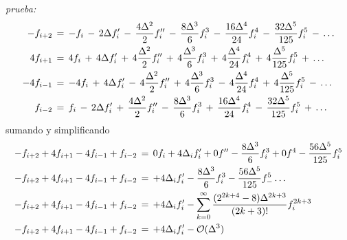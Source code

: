 \documentclass[9pt,technote,twoside,letterpaper,twocolumn]{IEEEtran}
\begin{document}
\emph{prueba:}
{\tiny
  \begin{align}
    -f_{i+2}&\,=\,-f_i
              \,-\,2\Delta f'_i
              \,-\,\frac{4\Delta^2}{2}f''_i
              \,-\,\frac{8\Delta^3}{6}f^3_i
              \,-\,\frac{16\Delta^4}{24}f^4_i
              \,-\,\frac{32\Delta^5}{125}f^5_i  
              \,-\,\ldots  
              \notag\\
    4f_{i+1}&\,=\,4f_i
              \,+\,4\Delta f'_i
              \,+\,4\frac{\Delta^2}{2}f''_i
              \,+\,4\frac{\Delta^3}{6}f^3_i
              \,+\,4\frac{\Delta^4}{24}f^4_i
              \,+\,4\frac{\Delta^5}{125}f^5_i  
              \,+\,\ldots  
              \notag\\
    -4f_{i-1}&\,=\,-4f_i
               \,+\,4\Delta f'_i
               \,-\,4\frac{\Delta^2}{2}f''_i
               \,+\,4\frac{\Delta^3}{6}f^3_i
               \,-\,4\frac{\Delta^4}{24}f^4_i
               \,+\,4\frac{\Delta^5}{125}f^5_i  
               \,-\,\ldots  
               \notag\\
    f_{i-2}&\,=\,f_i
             \,-\,2\Delta f'_i
             \,+\,\frac{4\Delta^2}{2}f''_i
             \,-\,\frac{8\Delta^3}{6}f^3_i
             \,+\,\frac{16\Delta^4}{24}f^4_i
             \,-\,\frac{32\Delta^5}{125}f^5_i  
             \,+\,\ldots
             \notag
  \end{align}
}
sumando y simplificando 
{\tiny
  \begin{align}
    -f_{i+2}+4f_{i+1}-4f_{i-1}+f_{i-2}\,&=\,0f_i
                                          +4\Delta_if'_i
                                          +0f''
                                          -\frac{8\Delta^3}{6}f^3_i
                                          +0f^4
                                          -\frac{56\Delta^5}{125}f^5_i\notag\\
    -f_{i+2}+4f_{i+1}-4f_{i-1}+f_{i-2}\,&=\,+4\Delta_if'_i
                                          -\frac{8\Delta^3}{6}f^3_i
                                          -\frac{56\Delta^5}{125}f^5_
                                          -\ldots\notag\\
    -f_{i+2}+4f_{i+1}-4f_{i-1}+f_{i-2}\,&=\,+4\Delta_if'_i
                                          -\sum^\infty_{k=0}\frac{(2^{2k+4}-8)\Delta^{2k+3}}{(2k+3)!}f^{2k+3}_i\notag\\
    -f_{i+2}+4f_{i+1}-4f_{i-1}+f_{i-2}\,&=\,+4\Delta_if'_i
                                          -\mathcal{O}(\Delta^3)
  \end{align}
}
\end{document}
